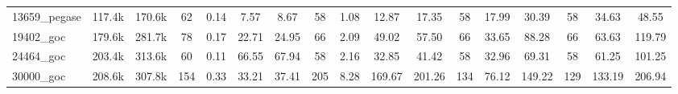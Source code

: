 \documentclass{standalone}
\begin{document}
\begin{tabular}{|l|c|c|cccc|cccc|ccc|ccc|}
13659\_pegase 
& 117.4k
& 170.6k
& 62 
&  0.14
&  7.57
&  8.67
& 58 
&  1.08
& 12.87
& 17.35
& 58 
& 17.99
& 30.39
& 58 
& 34.63
& 48.55
\\

19402\_goc 
& 179.6k
& 281.7k
& 78 
&  0.17
& 22.71
& 24.95
& 66 
&  2.09
& 49.02
& 57.50
& 66 
& 33.65
& 88.28
& 66 
& 63.63
& 119.79
\\

24464\_goc 
& 203.4k
& 313.6k
& 60 
&  0.11
& 66.55
& 67.94
& 58 
&  2.16
& 32.85
& 41.42
& 58 
& 32.96
& 69.31
& 58 
& 61.25
& 101.25
\\

30000\_goc 
& 208.6k
& 307.8k
& 154 
&  0.33
& 33.21
& 37.41
& 205 
&  8.28
& 169.67
& 201.26
& 134 
& 76.12
& 149.22
& 129 
& 133.19
& 206.94

  \\
  \hline
\end{tabular}
\end{document}

